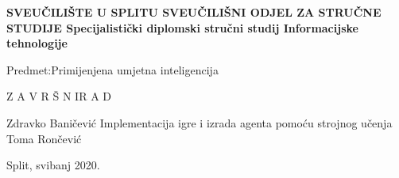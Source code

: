 %
%
\begin{titlepage}
	\bfseries
	\headerdata
	{SVEUČILIŠTE U SPLITU}
	{SVEUČILIŠNI ODJEL ZA STRUČNE STUDIJE}
	{Specijalistički diplomski stručni studij Informacijske tehnologije}
	
	\vspace*{5cm}
	\begin{flushleft}
		{\large   Predmet:\normalfont\space Primijenjena umjetna inteligencija}
	\end{flushleft}
	\vspace*{3cm}
	
	\begin{center}
		{\LARGE {Z A V R Š N I\space\space\space R A D}}
	\end{center}
	\vspace*{2cm}
	
	\thesisdata
	{Zdravko Baničević}
	{Implementacija igre i izrada agenta pomoću strojnog učenja}
	{Toma Rončević}
	
	\begin{center}
		\vfill
		{\large\normalfont Split, svibanj 2020.}
	\end{center}
\end{titlepage}
%
%